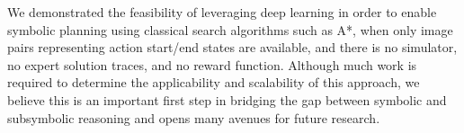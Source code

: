 \documentclass[11pt]{article}
\begin{document}
We demonstrated the feasibility of leveraging deep learning in order to enable 
symbolic planning using classical search algorithms such as A*, when only image pairs representing action start/end states are available,
and there is no simulator, no expert solution traces, and no reward function.
Although much work is required to determine the applicability and scalability of this approach,
we believe this is an important first step in bridging the gap between symbolic and subsymbolic reasoning and opens many avenues for future research.


\begin{comment}
Although we showed that \latentplanner works on several domains,
we did not provide the minor implementation details of the networks (see Appendix), nor claimed that it works on \emph{all} data.
A truly robust learner is {\it not} a problem unique to \latentplanner, but a fundamental problem in deep learning,
and future work will seek to leverage further improvements.





\end{comment}
\end{document}
